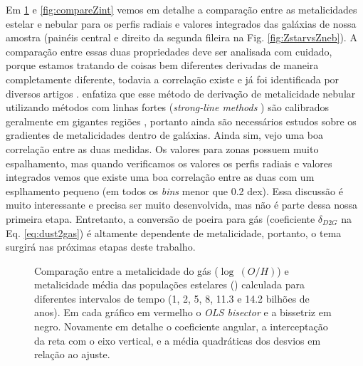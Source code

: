 Em \ref{fig:compareZR} e \ref{fig:compareZint} vemos em detalhe a comparação entre as metalicidades
estelar e nebular para os perfis radiais e valores integrados das galáxias de nossa amostra (painéis
central e direito da segunda fileira na Fig. \ref{fig:ZstarvsZneb}). A comparação entre essas duas
propriedades deve ser analisada com cuidado, porque estamos tratando de coisas bem diferentes
derivadas de maneira completamente diferente, todavia a correlação existe e já foi identificada por
diversos artigos \citep{CidFernandes.etal.2005a, Gallazzi.etal.2005a, CidFernandes.etal.2007a,
Asari.etal.2007a}. \citet{Stasinska.etal.2006a} enfatiza que esse método de derivação de
metalicidade nebular utilizando métodos com linhas fortes ({\em strong-line methods}
\citep{Pagel.etal.1979a}) são calibrados geralmente em gigantes regiões \Hii, portanto ainda são
necessários estudos sobre os gradientes de metalicidades dentro de galáxias. Ainda sim, vejo uma boa
correlação entre as duas medidas. Os valores para zonas possuem muito espalhamento, mas quando
verificamos os valores os perfis radiais e valores integrados vemos que existe uma boa correlação
entre as duas com um esplhamento pequeno (em todos os {\em bins} menor que 0.2 dex). Essa discussão
é muito interessante e precisa ser muito desenvolvida, mas não é parte dessa nossa primeira etapa.
Entretanto, a conversão de poeira para gás (coeficiente $\delta_{D2G}$ na Eq. \ref{eq:dust2gas}) é
altamente dependente de metalicidade, portanto, o tema surgirá nas próximas etapas deste trabalho.

\begin{figure}
	\centering
	\caption[ vs. $\log\ (O/H)$ - perfis radiais]
	{Comparação entre a metalicidade do gás ($\log\ (O/H)$) e metalicidade média das populações
estelares () calculada para diferentes intervalos de tempo (1, 2, 5, 8, 11.3 e
14.2 bilhões de anos). Em cada gráfico em vermelho o {\em OLS bisector} e a bissetriz em negro.
Novamente em detalhe o coeficiente angular, a interceptação da reta com o eixo vertical, e a média
quadráticas dos desvios em relação ao ajuste.}
	\label{fig:compareZR}
\end{figure}

